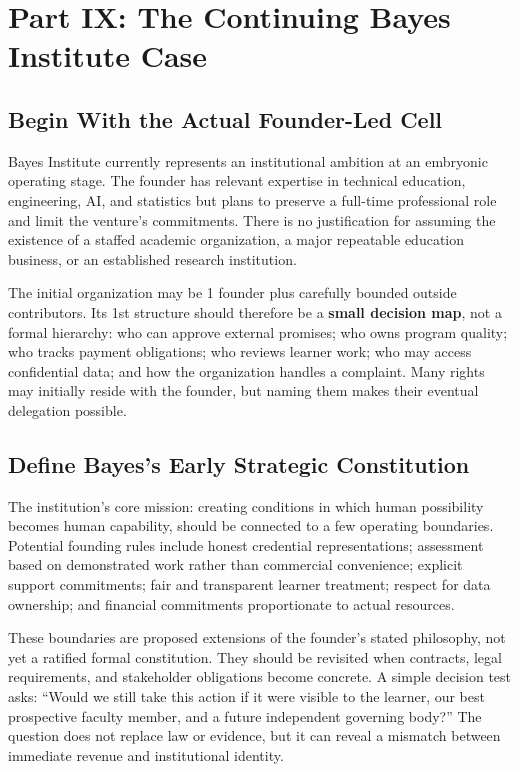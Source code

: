 \section*{Part IX: The Continuing Bayes Institute Case}

\subsection{Begin With the Actual Founder-Led Cell}
\label{sec:bayes_actual_founder_cell}

Bayes Institute currently represents an institutional ambition at an embryonic operating stage. The founder has relevant expertise in technical education, engineering, AI, and statistics but plans to preserve a full-time professional role and limit the venture's commitments. There is no justification for assuming the existence of a staffed academic organization, a major repeatable education business, or an established research institution.

The initial organization may be 1 founder plus carefully bounded outside contributors. Its 1st structure should therefore be a \textbf{small decision map}, not a formal hierarchy: who can approve external promises; who owns program quality; who tracks payment obligations; who reviews learner work; who may access confidential data; and how the organization handles a complaint. Many rights may initially reside with the founder, but naming them makes their eventual delegation possible.

\subsection{Define Bayes's Early Strategic Constitution}
\label{sec:bayes_early_constitution}

The institution's core mission: creating conditions in which human possibility becomes human capability, should be connected to a few operating boundaries. Potential founding rules include honest credential representations; assessment based on demonstrated work rather than commercial convenience; explicit support commitments; fair and transparent learner treatment; respect for data ownership; and financial commitments proportionate to actual resources.

These boundaries are proposed extensions of the founder's stated philosophy, not yet a ratified formal constitution. They should be revisited when contracts, legal requirements, and stakeholder obligations become concrete. A simple decision test asks: ``Would we still take this action if it were visible to the learner, our best prospective faculty member, and a future independent governing body?'' The question does not replace law or evidence, but it can reveal a mismatch between immediate revenue and institutional identity.

